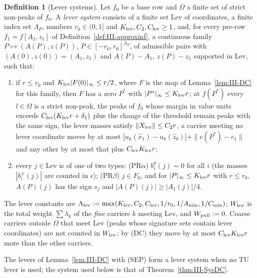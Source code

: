 \documentclass[10pt]{amsart}
\theoremstyle{definition}
\newtheorem{definition}[theorem]{Definition}
\theoremstyle{remark}
\newcommand{\zh}{\hat z}
\begin{document}
\begin{definition}[Lever systems]\label{def:III-levsys}
Let $f_0$ be a base row and $\Omega$ a finite set of strict non-peaks of
$f_0$.  A \emph{lever system} consists of a finite set $\mathrm{Lev}$ of
coordinates, a finite index set $\Lambda_P$, numbers $r_0\in(0,1]$ and
$K_{\rm lev},C_2,C_{\rm lev}\ge1$, and, for every pre-row $f_1=f[A_1,z_1]$ of
Definition~\textup{\ref{def:III-approxinf}}, a continuous family
$P\mapsto(A(P),z(P))$, $P\in[-r_0,r_0]^{\Lambda_P}$, of admissible pairs with
$(A(0),z(0))=(A_1,z_1)$ and $A(P)-A_1$, $z(P)-z_1$ supported in
$\mathrm{Lev}$, such that:
\begin{enumerate}
\item[(DC)] if $r\le r_0$ and $K_{\rm lev}|F(0)|_\infty\le r/2$, where $F$ is
the map of Lemma~\ref{lem:III-DC} for this family, then $F$ has a zero $P^*$
with $|P^*|_\infty\le K_{\rm lev}r$; at $f(P^*)$ every $l\in\Omega$ is a
strict non-peak, the peaks of $f_0$ whose margin in value units exceeds
$C_{\rm lev}(K_{\rm lev}r+\delta_1)$ plus the change of the threshold remain
peaks with the same sign, the lever masses satisfy $\|X_{\rm lev}\|\le C_2r$,
a carrier meeting no lever coordinate moves by at most $|u_k(\hat x_1)-
u_k(\zh_0)|+\|e(P^*)-e_1\|$ and any other by at most that plus $C_{\rm lev}
K_{\rm lev}r$;
\item[(PR)] every $j\in\mathrm{Lev}$ is of one of two types:
\textup{(PR$\alpha$)} $b^\theta_i(j)=0$ for all $i$ (the masses $|b^\pm_i(j)|$
are counted in $\epsilon$); \textup{(PR$\beta$)} $j\in F_0$, and for
$|P|_\infty\le K_{\rm lev}r$ with $r\le r_0$, $A(P)(j)$ has the sign $s_j$ and
$|A(P)(j)|\ge|A_1(j)|/4$.
\end{enumerate}
The lever constants are $\Lambda_{\rm lev}:=\max(K_{\rm lev},C_2,C_{\rm lev},
1/r_0,1/A_{\min},1/C_{\min})$; $W_{\rm lev}$ is the total weight
$\sum\lambda_k$ of the \emph{fine} carriers $k$ meeting $\mathrm{Lev}$, and
$W_{\rm pull}:=0$.  Coarse carriers outside $\Omega$ that meet $\mathrm{Lev}$ (peaks
whose signature sets contain lever coordinates) are not counted in $W_{\rm lev}$;
by (DC) they move by at most $C_{\rm lev}K_{\rm lev}r$ more than the other
carriers.
\end{definition}

The levers of Lemma~\ref{lem:III-DC} with (SEP) form a lever system when no TU
lever is used; the system used below is that of
Theorem~\ref{thm:III-SysDC}.
\end{document}
